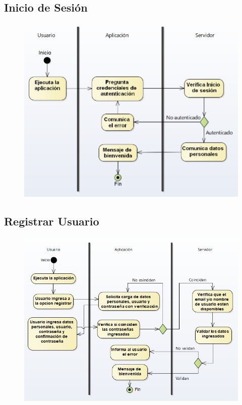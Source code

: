 \subsection{Inicio de Sesión}
\begin{figure}[H]
  \centering
    \includegraphics[width=1\textwidth]{imagenes/analisis/diagrama-actividad-inicioSesion.png}
    \label{fig:diagrama-actividad-autenticar}
\end{figure}

\subsection{Registrar Usuario}

\begin{figure}[H]
  \centering
    \includegraphics[width=1\textwidth]{imagenes/analisis/diagrama-actividad-registrar.png}
	\label{fig:diagrama-actividad-registrar}
\end{figure}

